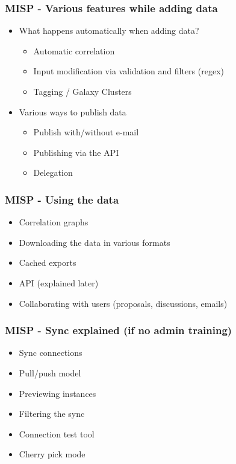 \begin{frame}
    \frametitle{MISP - Various features while adding data}
    \begin{itemize}
        \item What happens automatically when adding data?
        \begin{itemize}
            \item Automatic correlation
            \item Input modification via validation and filters (regex)
            \item Tagging / Galaxy Clusters
        \end{itemize}
        \item Various ways to publish data
        \begin{itemize}
            \item Publish with/without e-mail
            \item Publishing via the API
            \item Delegation
        \end{itemize}
    \end{itemize}
\end{frame}

\begin{frame}
    \frametitle{MISP - Using the data}
    \begin{itemize}
        \item Correlation graphs
        \item Downloading the data in various formats
        \item Cached exports
        \item API (explained later)
        \item Collaborating with users (proposals, discussions, emails)
    \end{itemize}
\end{frame}

\begin{frame}
    \frametitle{MISP - Sync explained (if no admin training)}
    \begin{itemize}
        \item Sync connections
        \item Pull/push model
        \item Previewing instances
        \item Filtering the sync
        \item Connection test tool
        \item Cherry pick mode
    \end{itemize}
\end{frame}

